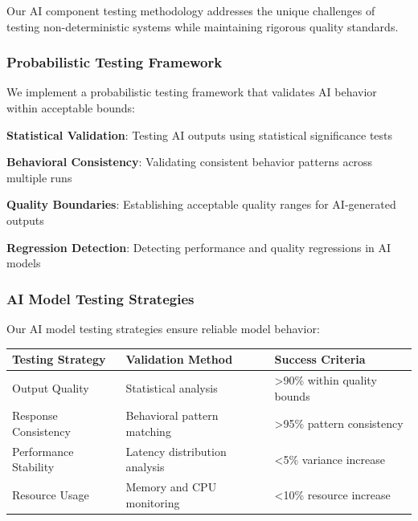 Our AI component testing methodology addresses the unique challenges of testing non-deterministic systems while maintaining rigorous quality standards.

\subsubsection*{Probabilistic Testing Framework}

We implement a probabilistic testing framework that validates AI behavior within acceptable bounds:

\begin{expandedlist}
    \item \textbf{Statistical Validation}: Testing AI outputs using statistical significance tests
    \item \textbf{Behavioral Consistency}: Validating consistent behavior patterns across multiple runs
    \item \textbf{Quality Boundaries}: Establishing acceptable quality ranges for AI-generated outputs
    \item \textbf{Regression Detection}: Detecting performance and quality regressions in AI models
\end{expandedlist}

\subsubsection*{AI Model Testing Strategies}

Our AI model testing strategies ensure reliable model behavior:

\begin{center}
\begin{tabular}{@{}lll@{}}
\toprule
\textbf{Testing Strategy} & \textbf{Validation Method} & \textbf{Success Criteria} \\
\midrule
Output Quality & Statistical analysis & >90\% within quality bounds \\
Response Consistency & Behavioral pattern matching & >95\% pattern consistency \\
Performance Stability & Latency distribution analysis & <5\% variance increase \\
Resource Usage & Memory and CPU monitoring & <10\% resource increase \\
\bottomrule
\end{tabular}
\end{center}

